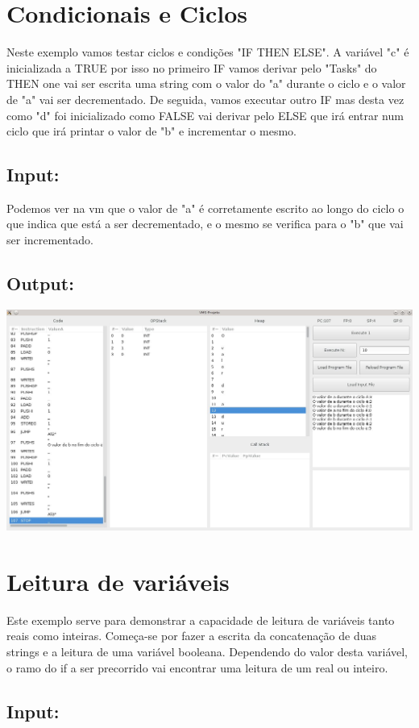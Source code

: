 \documentclass{report}
\begin{document}
\section{Condicionais e Ciclos}
Neste exemplo vamos testar ciclos e condições "IF THEN ELSE". A variável "c" é inicializada a TRUE por isso no primeiro IF vamos derivar pelo "Tasks" do THEN one vai ser escrita uma string com o valor do "a" durante o ciclo e o valor de "a" vai ser decrementado. De seguida, vamos executar outro IF mas desta vez como "d" foi inicializado como FALSE vai derivar pelo ELSE que irá entrar num ciclo que irá printar o valor de "b" e incrementar o mesmo.
\subsection{Input:}
Podemos ver na vm que o valor de "a" é corretamente escrito ao longo do ciclo o que indica que está a ser decrementado, e o mesmo se verifica para o "b" que vai ser incrementado.
\subsection{Output:}

\includegraphics[width=\linewidth]{IfUntilReadWrite.jpg}


\section{Leitura de variáveis}
Este exemplo serve para demonstrar a capacidade de leitura de variáveis tanto reais como inteiras. Começa-se por fazer a escrita da concatenação de duas strings e a leitura de uma variável booleana. Dependendo do valor desta variável, o ramo do if a ser precorrido vai encontrar uma leitura de um real ou inteiro.
\subsection{Input:}
\end{document}
